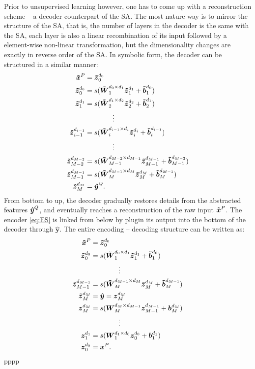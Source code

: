 Prior to unsupervised learning however, one has to come up with a reconstruction scheme -- a decoder counterpart of the SA. The most nature way is to mirror the structure of the SA, that is, the number of layers in the decoder is the same with the SA, each layer is also a linear recombination of its input followed by a element-wise non-linear transformation, but the dimensionality changes are exactly in reverse order of the SA. In symbolic form, the decoder can be structured in a similar manner:
\begin{equation} \label{eq:DS}
\begin{split}
  \xDC^P &= \zDI{0}{0} \\
  \zDI{0  }{0  } &= s(\WDI{1  }{0  }{1  } \zDI{1  }{1  } + \bDI{1  }{0  }) \\
  \zDI{1  }{1  } &= s(\WDI{2  }{1  }{2  } \zDI{2  }{2  } + \bDI{2  }{1  }) \\
  & \quad \quad \quad \quad \vdots \\
  \zDI{i-1}{i-1} &= s(\WDI{i  }{i-1}{i  } \zDI{i  }{i  } + \bDI{i  }{i-1}) \\
  & \quad \quad \quad \quad \vdots \\
  \zDI{M-2}{M-2} &= s(\WDI{M-1}{M-2}{M-1} \zDI{M-1}{M-1} + \bDI{M-1}{M-2}) \\
  \zDI{M-1}{M-1} &= s(\WDI{M  }{M-1}{M  } \zDI{M  }{M  } + \bDI{M  }{M-1}) \\
  \zDI{M  }{M  } &= \yHT^Q .
\end{split}
\end{equation}
From bottom to up, the decoder gradually restores details from the abstracted features $\yHT^Q$, and eventually reaches a reconstruction of the raw input $\xDC^P$. The encoder \ref{eq:ES} is linked from below by plugin its output into the bottom of the decoder through ${\boldsymbol{\hat{y}}}$. The entire encoding -- decoding structure can be written as:
\begin{equation} \label{eq:ED}
\begin{split}
  \xDC^P &= \zDI{0}{0} \\
  \zDI{0  }{0  } &= s(\WDI{1  }{0  }{1  } \zDI{1  }{1  } + \bDI{1}{0  }) \\
  & \quad \quad \quad \quad \vdots \\
  \zDI{M-1}{M-1} &= s(\WDI{M  }{M-1}{M  } \zDI{M  }{M  } + \bDI{M}{M-1}) \\
  \zDI{M  }{M  } &= \yHT = \zEI{M}{M} \\
  \zEI{M  }{M  } &= s(\WEI{M  }{M  }{M-1} \zEI{M-1}{M-1} + \bEI{M}{M  }) \\
  & \quad \quad \quad \quad \vdots \\
  \zEI{1  }{1  } &= s(\WEI{1  }{1  }{0  } \zEI{0  }{0  } + \bEI{1}{1  }) \\
  \zEI{0  }{0  } &= \xEC^P.
\end{split}
\end{equation}pppp
